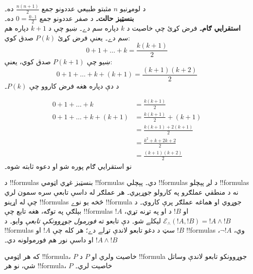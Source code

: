 \documentclass[../../../include/open-logic-section]{subfiles}
\begin{document}
\begin{ex} د لومړنيو $n$ مثبتو طبيعي عددونو جمع $\frac{n(n+1)}{2}$ ده۔ \\

\textbf{بنسټيز حالت۔} د صفر عددونو جمع $0=
\frac{0\cdot 1}{2}$ ده۔\\

\textbf{استقرايي ګام۔} فرض کړئ چې خاصيت د $k$ دپاره سم دے۔ ښيو چې د $k+1$ دپاره هم سم دے۔ يعنې فرض کړئ $P(k)$ صدق کوي:
\[ 0 + 1 + \ldots + k = \frac{k(k+1)}{2} \]
ښيو چې $P(k+1)$ صدق کوي، يعنې:
\[ 0 + 1 + \ldots + k + (k+1) = \frac{(k+1)(k+2)}{2} \]
د دې دپاره هغه فرض کاروو چې $P(k)$۔

\begin{align*}
0 + 1 + \ldots + k &= \frac{k(k+1)}{2} \tag{فرض} \\
0 + 1 + \ldots + k + (k+1) &= \frac{k(k+1)}{2} + (k+1)
\tag{دواړو خواوو ته $k+1$ زيات کړئ} \\
&= \frac{k(k+1) + 2(k+1)}{2} \\
&= \frac{k^2 + k + 2k +2}{2} \\
&=\frac{(k+1)(k+2)}{2}
\end{align*}
نو استقرايي ګام پوره شو او دعوه ثابته شوه۔
\end{ex}

\begin{explain}
د !!{formula}s بنسټيز غړي اټومي !!{formula}s دي۔ پېچلي !!{formula}s د لږ پېچلو !!{formula}s نه د منطقي عملګرو په کارولو جوړېږي۔ هر عملګر له داسې تابعې سره سمون لري چې له اړينو !!{formula}s څخه يو نوے !!{formula} جوړوي او هماغه عملګر پرې کاروي۔ د بېلګې په توګه، هغه تابع چې !!{formula}s $!A$ او $!B$ د او په تړنه تړي، $\mathcal E _\land (!A,
!B) = !A \land !B$ ليکلے شو۔ دې تابعو ته \emph{فورمول جوړوونکې تابعې} وايو۔ د !!{formula}s سټ د دغو تابعو لاندې تړلے دے؛ هر کله چې $!A$ او $!B$ !!{formula}s وي، $\lnot !A$، $!A \land
!B$ او داسې نور هم فورمولونه دي۔
\end{explain}

\begin{defn}
که هر اټومي !!{formula}، $P$ خاصيت ولري او $P$ د !!{formula} جوړوونکو تابعو لاندې وساتل شي، نو هر !!{formula}، $P$ خاصيت لري۔
\end{defn}
\end{document}
